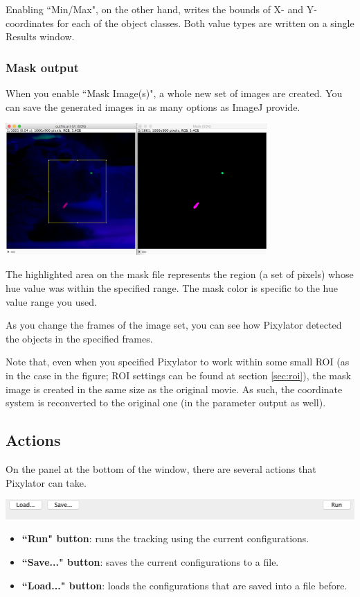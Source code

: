\documentclass[a4paper,oneside,10pt]{article}
\begin{document}
Enabling ``Min/Max", on the other hand, writes the bounds of X- and Y-coordinates for each of the object classes. Both value types are written on a single Results window.


\subsubsection{Mask output}

When you enable ``Mask Image(s)", a whole new set of images are created. You can save the generated images in as many options as ImageJ provide.

\includegraphics[width=10cm]{masks.png}

The highlighted area on the mask file represents the region (a set of pixels) whose hue value was within the specified range. The mask color is specific to the hue value range you used.

As you change the frames of the image set, you can see how Pixylator detected the objects in the specified frames.

Note that, even when you specified Pixylator to work within some small ROI (as in the case in the figure; ROI settings can be found at section \ref{sec:roi}), the mask image is created in the same size as the original movie. As such, the coordinate system is reconverted to the original one (in the parameter output as well).


\subsection{Actions}
On the panel at the bottom of the window, there are several actions that Pixylator can take.

\includegraphics[width=14cm]{actions.png}

\begin{itemize}
\item {\bf ``Run" button}: runs the tracking using the current configurations.
\item {\bf ``Save..." button}: saves the current configurations to a file.
\item {\bf ``Load..." button}: loads the configurations that are saved into a file before.
\end{itemize}
\end{document}
